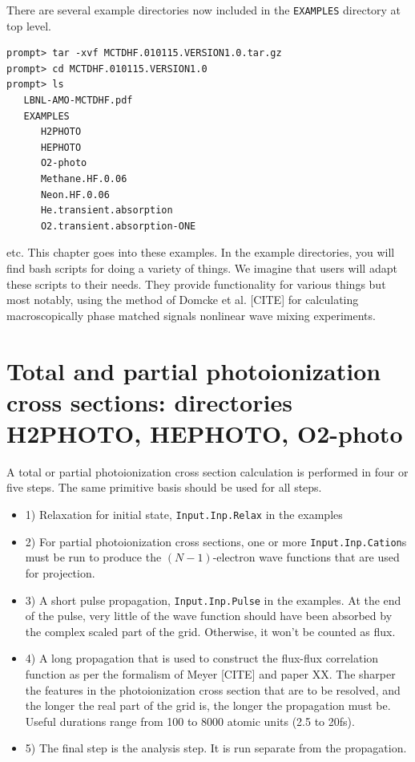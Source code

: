 \documentclass[10pt,leqno, oneside]{book}
\begin{document}
There are several example directories now included in the \verb#EXAMPLES# directory at top level.

{\footnotesize
\begin{verbatim}
prompt> tar -xvf MCTDHF.010115.VERSION1.0.tar.gz
prompt> cd MCTDHF.010115.VERSION1.0
prompt> ls
   LBNL-AMO-MCTDHF.pdf
   EXAMPLES
      H2PHOTO
      HEPHOTO
      O2-photo
      Methane.HF.0.06
      Neon.HF.0.06
      He.transient.absorption
      O2.transient.absorption-ONE
\end{verbatim}
}

etc.  This chapter goes into these examples.  In the example directories, you will find bash scripts for doing a variety of things.
We imagine that users will adapt these scripts to their needs.  They provide functionality for various things but most notably,
using the method of Domcke et al. [CITE] for calculating macroscopically phase matched signals nonlinear wave mixing experiments.



\section{Total and partial photoionization cross sections: directories H2PHOTO, HEPHOTO, O2-photo }

A total or partial photoionization cross section calculation is performed in four or five steps.  
The same primitive basis should be used for all steps.
%
\begin{itemize}
\item{1) Relaxation for initial state, \verb#Input.Inp.Relax# in the examples}
\item{2) For partial photoionization cross sections, one or more \verb#Input.Inp.Cation#s must be run to produce the $(N-1)$-electron wave functions
that are used for projection.}
\item{3) A short pulse propagation, \verb#Input.Inp.Pulse# in the examples.  At the end of the pulse, very little of the wave function should have 
been absorbed by the complex scaled part of the grid.  Otherwise, it won't be counted as flux.}
\item{4) A long propagation that is used to construct the flux-flux correlation function as per the formalism of Meyer [CITE] and paper XX.  The sharper the features
in the photoionization cross section that are to be resolved, and the longer the real part of the grid is,
the longer the propagation must be.  Useful durations range from 100 to 8000 atomic units (2.5 to 20fs).}
\item{5) The final step is the analysis step.  It is run separate from the propagation. }
\end{itemize}
\end{document}
